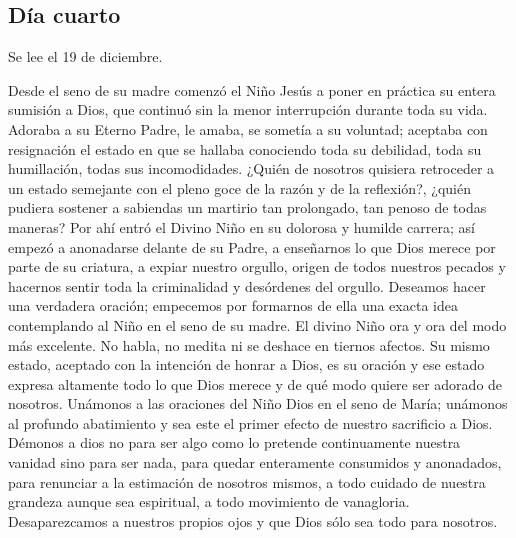\documentclass[spanish,utf8,twocolumn]{chlart}
\newenvironment{summary}{\begingroup
	\small\sffamily\itshape%
	\setlength{\leftskip}{3em}\setlength{\rightskip}{3em}\noindent
	}{\par\endgroup}
\newenvironment{lectura}{\begingroup\color{lector}}{\endgroup\par}
\begin{document}
\subsection*{Día cuarto}
\begin{summary}
Se lee el 19 de diciembre.
\end{summary}
\begin{lectura}
Desde el seno de su madre comenzó el Niño Jesús a poner en práctica su
entera sumisión a Dios, que continuó sin la menor interrupción durante
toda su vida.
Adoraba a su Eterno Padre, le amaba, se sometía a su voluntad; aceptaba
con resignación el estado en que se hallaba conociendo toda su
debilidad, toda su humillación, todas sus incomodidades.
¿Quién de nosotros quisiera retroceder a un estado semejante con el
pleno goce de la razón y de la reflexión?, ¿quién pudiera sostener a
sabiendas un martirio tan prolongado, tan penoso de todas maneras?
Por ahí entró el Divino Niño en su dolorosa y humilde carrera; así
empezó a anonadarse delante de su Padre, a enseñarnos lo que Dios merece
por parte de su criatura, a expiar nuestro orgullo, origen de todos
nuestros pecados y hacernos sentir toda la criminalidad y desórdenes del
orgullo.
Deseamos hacer una verdadera oración; empecemos por formarnos de ella
una exacta idea contemplando al Niño en el seno de su madre.
El divino Niño ora y ora del modo más excelente.
No habla, no medita ni se deshace en tiernos afectos.
Su mismo estado, aceptado con la intención de honrar a Dios, es su
oración y ese estado expresa altamente todo lo que Dios merece y de qué
modo quiere ser adorado de nosotros.
Unámonos a las oraciones del Niño Dios en el seno de María; unámonos al
profundo abatimiento y sea este el primer efecto de nuestro sacrificio a
Dios.
Démonos a dios no para ser algo como lo pretende continuamente nuestra
vanidad sino para ser nada, para quedar enteramente consumidos y
anonadados, para renunciar a la estimación de nosotros mismos, a todo
cuidado de nuestra grandeza aunque sea espiritual, a todo movimiento de
vanagloria.
Desaparezcamos a nuestros propios ojos y que Dios sólo sea todo para
nosotros.
\end{lectura}
\end{document}
